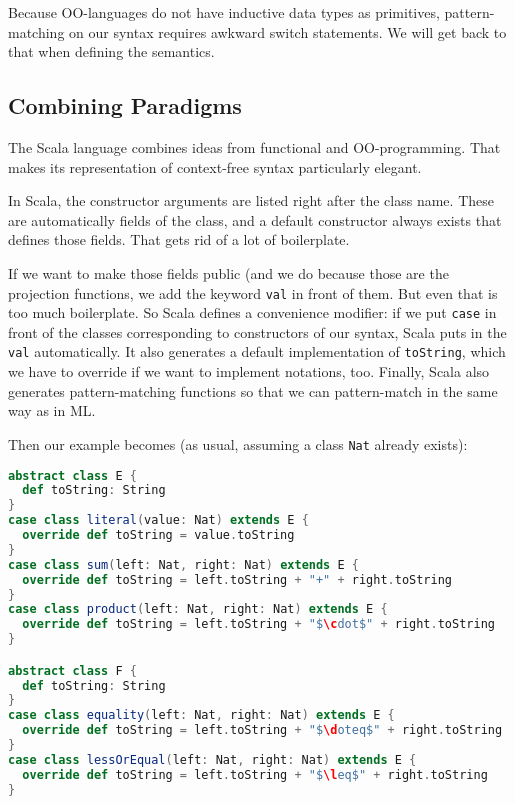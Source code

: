 Because OO-languages do not have inductive data types as primitives, pattern-matching on our syntax requires awkward switch statements.
We will get back to that when defining the semantics.

\subsection{Combining Paradigms}

The Scala language combines ideas from functional and OO-programming.
That makes its representation of context-free syntax particularly elegant.

In Scala, the constructor arguments are listed right after the class name.
These are automatically fields of the class, and a default constructor always exists that defines those fields.
That gets rid of a lot of boilerplate.

If we want to make those fields public (and we do because those are the projection functions, we add the keyword \texttt{val} in front of them.
But even that is too much boilerplate. So Scala defines a convenience modifier: if we put \texttt{case} in front of the classes corresponding to constructors of our syntax, Scala puts in the \texttt{val} automatically.
It also generates a default implementation of \texttt{toString}, which we have to override if we want to implement notations, too.
Finally, Scala also generates pattern-matching functions so that we can pattern-match in the same way as in ML.

Then our example becomes (as usual, assuming a class \texttt{Nat} already exists):

\begin{lstlisting}[language=scala]
abstract class E {
  def toString: String
}
case class literal(value: Nat) extends E {
  override def toString = value.toString
}
case class sum(left: Nat, right: Nat) extends E {
  override def toString = left.toString + "+" + right.toString
}
case class product(left: Nat, right: Nat) extends E {
  override def toString = left.toString + "$\cdot$" + right.toString
}

abstract class F {
  def toString: String
}
case class equality(left: Nat, right: Nat) extends E {
  override def toString = left.toString + "$\doteq$" + right.toString
}
case class lessOrEqual(left: Nat, right: Nat) extends E {
  override def toString = left.toString + "$\leq$" + right.toString
}
\end{lstlisting}



